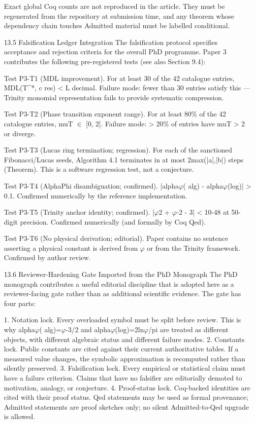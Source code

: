   Exact global Coq counts are not reproduced in the article. They must be regenerated
  from the repository at submission time, and any theorem whose dependency chain
  touches Admitted material must be labelled conditional.

  13.5 Falsification Ledger Integration
  The falsification protocol specifies acceptance and rejection criteria for the overall PhD
  programme. Paper 3 contributes the following pre-registered tests (see also Section
  9.4):

  Test P3-T1 (MDL improvement). For at least 30 of the 42 catalogue entries, MDL(T^*, c
  res) < L decimal. Failure mode: fewer than 30 entries satisfy this --- Trinity monomial
  representation fails to provide systematic compression.

  Test P3-T2 (Phase transition exponent range). For at least 80\% of the 42 catalogue
  entries, muT $\in$ [0, 2]. Failure mode: > 20\% of entries have muT > 2 or diverge.

  Test P3-T3 (Lucas ring termination; regression). For each of the sanctioned
  Fibonacci/Lucas seeds, Algorithm 4.1 terminates in at most 2max(|a|,|b|) steps
  (Theorem). This is a software regression test, not a conjecture.

  Test P3-T4 (AlphaPhi disambiguation; confirmed). |alpha$\varphi$( alg) - alpha$\varphi$(log)| > 0.1.
  Confirmed numerically by the reference implementation.

  Test P3-T5 (Trinity anchor identity; confirmed). |$\varphi$2 + $\varphi$-2 - 3| < 10-48 at 50-digit
  precision. Confirmed numerically (and formally by Coq Qed).

  Test P3-T6 (No physical derivation; editorial). Paper contains no sentence asserting a
  physical constant is derived from $\varphi$ or from the Trinity framework. Confirmed by author
  review.

  13.6 Reviewer-Hardening Gate Imported from the PhD Monograph
  The PhD monograph contributes a useful editorial discipline that is adopted here as a
  reviewer-facing gate rather than as additional scientific evidence. The gate has four
  parts:

  1. Notation lock. Every overloaded symbol must be split before review. This is why
  alpha$\varphi$( alg)=$\varphi$-3/2 and alpha$\varphi$(log)=2ln$\varphi$/pi are treated as different objects, with
  different algebraic status and different failure modes.
  2. Constants lock. Public constants are cited against their current authoritative tables.
  If a measured value changes, the symbolic approximation is recomputed rather than
  silently preserved.
  3. Falsification lock. Every empirical or statistical claim must have a failure criterion.
  Claims that have no falsifier are editorially demoted to motivation, analogy, or
  conjecture.
  4. Proof-status lock. Coq-backed identities are cited with their proof status. Qed
  statements may be used as formal provenance; Admitted statements are proof sketches
  only; no silent Admitted-to-Qed upgrade is allowed.

